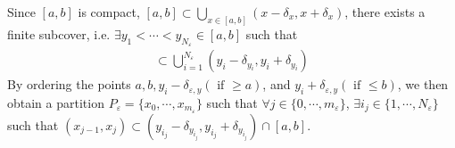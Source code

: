 \documentclass{tufte-handout}
\begin{document}
Since \( [a,b] \) is compact, 
\( 
    [a,b] \subset \bigcup_{x \in [a,b]} (x-\delta_x, x+\delta_x)
\),
there exists a finite subcover, i.e. \(\exists y_1 < \cdots < y_{N_\varepsilon} \in [a,b] \)
such that 
\begin{align}
    [a,b] \subset \bigcup_{i=1}^{N_\varepsilon}(y_i - \delta_{y_i}, y_i + \delta_{y_i})
\end{align}
By ordering the points 
\(a,b,y_i-\delta_{\varepsilon, y} (\text{ if } \geq a)\), 
and \(y_i+\delta_{\varepsilon, y} (\text{ if } \leq b)\),
we then obtain a partition \( P_\varepsilon = \{x_0, \cdots, x_{m_\varepsilon}\} \)
such that  \(\forall j \in \{0, \cdots, m_\varepsilon\}\),
\(\exists i_j \in \{1, \cdots, N_\varepsilon\}\) such 
that \( (x_{j-1}, x_j) \subset (y_{i_j} - \delta_{y_{i_j}}, y_{i_j} + \delta_{y_{i_j}})\cap [a,b] \).
\end{document}
